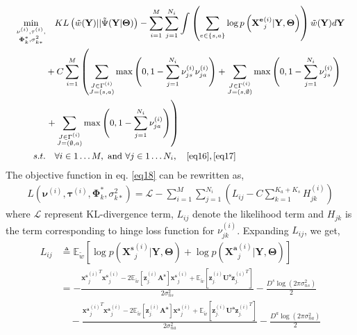\documentclass[runningheads]{llncs}
\begin{document}
\begin{equation}{\small
\begin{aligned}
\label{eq18}
\min_{\substack{\mathbf{\nu}^{(i)}, \mathbf{\tau}^{(i)}, \\ \mathbf{\Phi}_k^*, \sigma_{k*}^2}} &\quad KL\left(\tilde{w}(\mathbf{Y}) || \tilde{\Psi}(\mathbf{Y}|\mathbf{\Theta})\right) 
 - \sum_{i=1}^M \sum_{j=1}^{N_i} \int \left(\sum_{e\in\{s,a\}}\log p\left(\mathbf{X^e}^{(i)}_j | \mathbf{Y}, \mathbf{\Theta}\right) \right) \tilde{w}(\mathbf{Y}) d\mathbf{Y}   \\
 & + C \sum_{i=1}^M \left(\sum_{\substack{J \in \Gamma^{(i)} \\ J = (s,a)}} \max\left(0,1-\sum_{j=1}^{N_i}  \nu_{js}^{(i)}\nu_{ja}^{(i)}\right)
+ \sum_{\substack{J \in \Gamma^{(i)} \\ J = (s,\emptyset)}} \max\left(0,1-\sum_{j=1}^{N_i}  \nu_{js}^{(i)}\right) \right.\\
& \left.+ \sum_{\substack{J \in \Gamma^{(i)} \\ J = (\emptyset,a)}} \max\left(0,1-\sum_{j=1}^{N_i} \nu_{ja}^{(i)}\right)\right) \\
s.t. & \quad \forall i \in 1\dots M, \text{ and } \forall j \in 1\dots N_i, \quad \eqref{eq16}, \eqref{eq17}
\end{aligned}
}
\end{equation}\noindent The objective function in eq. \eqref{eq18} can be rewritten as,
\begin{align}
L(\mathbf{\nu}^{(i)}, \mathbf{\tau}^{(i)}, \mathbf{\Phi}_k^*, \sigma_{k*}^2) = \mathcal{L} - \sum_{i=1}^M\sum_{j=1}^{N_i} \left( L_{ij} - C  \sum_{k=1}^{K_a + K_s}H_{jk}^{(i)}\right) \label{eq19}
\end{align}
where $\mathcal{L}$ represent KL-divergence term, $L_{ij}$ denote the likelihood term and $H_{jk}$ is the term corresponding to hinge loss function for $\nu_{jk}^{(i)}$. Expanding $L_{ij}$, we get,
\begin{align}
L_{ij} &\triangleq \mathbb{E}_{\tilde{w}}\left[\log p(\mathbf{X^s}^{(i)}_j | \mathbf{Y}, \mathbf{\Theta}) + \log p(\mathbf{X^a}^{(i)}_j | \mathbf{Y}, \mathbf{\Theta})\right] \label{ref1} \\
&= - \frac{{\mathbf{x^s}_j^{(i)}}^T\mathbf{x^s}_j^{(i)} -2 \mathbb{E}_{\tilde{w}}[\mathbf{z}_{j.}^{(i)}\mathbf{A^s}]\mathbf{x^s}_j^{(i)} + \mathbb{E}_{\tilde{w}}[\mathbf{z}_{j.}^{(i)}\mathbf{U^s}{\mathbf{z}_{j.}^{(i)}}^T]}{2\sigma_{ns}^2} - \frac{D^s\log(2\pi\sigma_{ns}^2)}{2} \nonumber \\
& \quad - \frac{{\mathbf{x^a}_j^{(i)}}^T\mathbf{x^a}_j^{(i)} -2 \mathbb{E}_{\tilde{w}}[\mathbf{z}_{j.}^{(i)}\mathbf{A^a}]\mathbf{x^a}_j^{(i)} + \mathbb{E}_{\tilde{w}}[\mathbf{z}_{j.}^{(i)}\mathbf{U^a}{\mathbf{z}_{j.}^{(i)}}^T]}{2\sigma_{na}^2} - \frac{D^a\log(2\pi\sigma_{na}^2)}{2}
\end{align}
\end{document}
